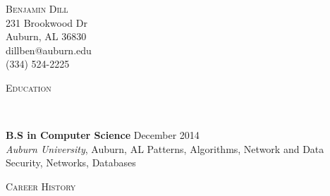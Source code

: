 \documentclass[9pt]{article}
\newenvironment{changemargin}[2]{%
  \begin{list}{}{%
    \setlength{\topsep}{0pt}%
    \setlength{\leftmargin}{#1}%
    \setlength{\rightmargin}{#2}%
    \setlength{\listparindent}{\parindent}%
    \setlength{\itemindent}{\parindent}%
    \setlength{\parsep}{\parskip}%
  }%
  \item[]}{\end{list}
}
\newcommand{\lineover}{
	\begin{changemargin}{-0.05in}{-0.05in}
		\vspace*{-8pt}
		\hrulefill \\
		\vspace*{-2pt}
	\end{changemargin}
}
\newcommand{\header}[1]{
	\begin{changemargin}{-0.5in}{-0.5in}
		\scshape{#1}\\
  	\lineover
	\end{changemargin}
}
\newcommand{\contact}[5]{
	\begin{changemargin}{-0.5in}{-0.5in}
		\begin{center}
			{\Large \scshape {#1}}\\ \smallskip
			{#2}\\ \smallskip 
			{#3}\\ \smallskip
			{#4}\\ \smallskip
			{#5}\smallskip
		\end{center}
	\end{changemargin}
}
\newenvironment{body} {
	\vspace*{-16pt}
	\begin{changemargin}{-0.25in}{-0.5in}
  }	
	{\end{changemargin}
}
\begin{document}
\contact{Benjamin Dill}{231 Brookwood Dr}{Auburn, AL 36830}{dillben@auburn.edu}{(334) 524-2225}


%
%


\header{Education}

\begin{body}
	\vspace{17pt}
	\textbf{B.S in Computer Science}{} \hfill December 2014{} \\
	\emph{Auburn University}, Auburn, AL{} %
	\hspace{4ex} Patterns, Algorithms, Network and Data Security, Networks, Databases
\end{body}

\smallskip


\header{Career History}
\end{document}
